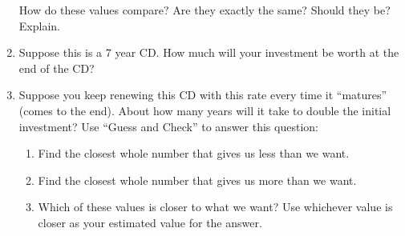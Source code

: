 \documentclass{ximera}
\begin{document}
\begin{example}
\begin{enumerate}
How do these values compare?  Are they exactly the same?  Should they be?  Explain.
\item Suppose this is a 7 year CD.  How much will your investment be worth at the end of the CD?
\item Suppose you keep renewing this CD with this rate every time it ``matures'' (comes to the end).  About how many years will it take to double the initial investment?
Use ``Guess and Check'' to answer this question:
\begin{enumerate}
\item  Find the closest whole number that gives us less than we want.
\item Find the closest whole number that gives us more than we want.
\item Which of these values is closer to what we want?  Use whichever value is closer as your estimated value for the answer.
\end{enumerate}
\end{enumerate}
\end{example}
\end{document}
